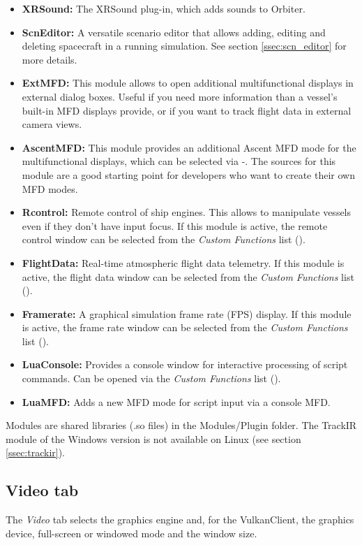 \documentclass[Orbiter User Manual.tex]{subfiles}
\begin{document}
\begin{itemize}
\item \textbf{XRSound:} The XRSound plug-in, which adds sounds to Orbiter.
\item \textbf{ScnEditor:} A versatile scenario editor that allows adding, editing and deleting spacecraft in a running simulation. See section \ref{ssec:scn_editor} for more details.
\item \textbf{ExtMFD:} This module allows to open additional multifunctional displays in external dialog boxes. Useful if you need more information than a vessel's built-in MFD displays provide, or if you want to track flight data in external camera views.
\item \textbf{AscentMFD:} This module provides an additional Ascent MFD mode for the multifunctional displays, which can be selected via \Shift{}-\Shift{}. The sources for this module are a good starting point for developers who want to create their own MFD modes.
\item \textbf{Rcontrol:} Remote control of ship engines. This allows to manipulate vessels even if they don't have input focus. If this module is active, the remote control window can be selected from the \textit{Custom Functions} list (\Ctrl{}).
\item \textbf{FlightData:} Real-time atmospheric flight data telemetry. If this module is active, the flight data window can be selected from the \textit{Custom Functions} list (\Ctrl{}).
\item \textbf{Framerate:} A graphical simulation frame rate (FPS) display. If this module is active, the frame rate window can be selected from the \textit{Custom Functions} list (\Ctrl{}).
\item \textbf{LuaConsole:} Provides a console window for interactive processing of script commands. Can be opened via the \textit{Custom Functions} list (\Ctrl{}).
\item \textbf{LuaMFD:} Adds a new MFD mode for script input via a console MFD.
\end{itemize}

\noindent
Modules are shared libraries (.so files) in the Modules/Plugin folder. The TrackIR module of the Windows version is not available on Linux (see section \ref{ssec:trackir}).


\subsection{Video tab}
\label{ssec:launchpad_video}
The \textit{Video} tab selects the graphics engine and, for the VulkanClient, the graphics device, full-screen or windowed mode and the window size.
\end{document}
